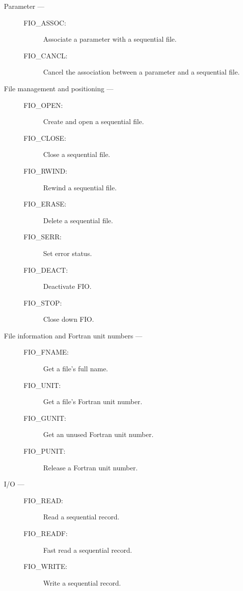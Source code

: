 \begin{description}

\item [Parameter ---]

\begin{description}
\item [FIO\_ASSOC:]  Associate a parameter with a sequential file.
\item [FIO\_CANCL:]  Cancel the association between a parameter and a
 sequential file.
\end{description}

\item [File management and positioning ---]

\begin{description}
\item [FIO\_OPEN:]  Create and open a sequential file.
\item [FIO\_CLOSE:]  Close a sequential file.
\item [FIO\_RWIND:]  Rewind a sequential file.
\item [FIO\_ERASE:]  Delete a sequential file.
\item [FIO\_SERR:]  Set error status.
\item [FIO\_DEACT:]  Deactivate FIO.
\item [FIO\_STOP:]  Close down FIO.
\end{description}

\item [File information and Fortran unit numbers ---]

\begin{description}
\item [FIO\_FNAME:]  Get a file's full name.
\item [FIO\_UNIT:]  Get a file's Fortran unit number.
\item [FIO\_GUNIT:]  Get an unused Fortran unit number.
\item [FIO\_PUNIT:]  Release a Fortran unit number.
\end{description}

\item [I/O ---]

\begin{description}
\item [FIO\_READ:]  Read a sequential record.
\item [FIO\_READF:]  Fast read a sequential record.
\item [FIO\_WRITE:]  Write a sequential record.
\end{description}

\end{description}

